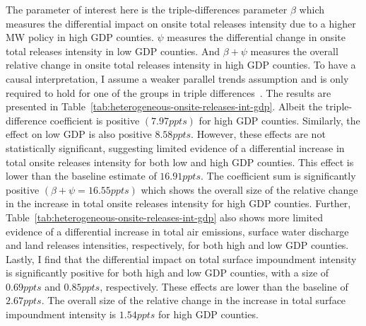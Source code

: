 \documentclass[12pt, english]{article}
\begin{document}
    The parameter of interest here is the triple-differences parameter $\beta$ which measures the differential impact on onsite total releases intensity due to a higher MW policy in high GDP counties. $\psi$ measures the differential change in onsite total releases intensity in low GDP counties. And $\beta + \psi$ measures the overall relative change in onsite total releases intensity in high GDP counties. To have a causal interpretation, I assume a weaker parallel trends assumption and is only required to hold for one of the groups in triple differences~\parencite{olden2022triple}. The results are presented in Table~\ref{tab:heterogeneous-onsite-releases-int-gdp}. Albeit the triple-difference coefficient is positive $(7.97ppts)$ for high GDP counties. Similarly, the effect on low GDP is also positive $8.58ppts$. However, these effects are not statistically significant, suggesting limited evidence of a differential increase in total onsite releases intensity for both low and high GDP counties. This effect is lower than the baseline estimate of $16.91ppts$. The coefficient sum is significantly positive $(\beta + \psi = 16.55ppts)$ which shows the overall size of the relative change in the increase in total onsite releases intensity for high GDP counties. Further, Table~\ref{tab:heterogeneous-onsite-releases-int-gdp} also shows more limited evidence of a differential increase in total air emissions, surface water discharge and land releases intensities, respectively, for both high and low GDP counties. Lastly, I find that the differential impact on total surface impoundment intensity is significantly positive for both high and low GDP counties, with a size of $0.69ppts$ and $0.85ppts$, respectively. These effects are lower than the baseline of $2.67ppts$. The overall size of the relative change in the increase in total surface impoundment intensity is $1.54ppts$ for high GDP counties.
    
\end{document}
